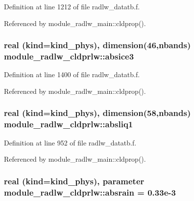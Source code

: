 Definition at line 1212 of file radlw\+\_\+datatb.\+f.



Referenced by module\+\_\+radlw\+\_\+main\+::cldprop().

\subsubsection[{\texorpdfstring{absice3}{absice3}}]{\setlength{\rightskip}{0pt plus 5cm}real (kind=kind\+\_\+phys), dimension(46,nbands) module\+\_\+radlw\+\_\+cldprlw\+::absice3}\hypertarget{namespacemodule__radlw__cldprlw_a3aa04541d0b809367f88ef8aa0eafdbb}{}\label{namespacemodule__radlw__cldprlw_a3aa04541d0b809367f88ef8aa0eafdbb}


Definition at line 1400 of file radlw\+\_\+datatb.\+f.



Referenced by module\+\_\+radlw\+\_\+main\+::cldprop().

\subsubsection[{\texorpdfstring{absliq1}{absliq1}}]{\setlength{\rightskip}{0pt plus 5cm}real (kind=kind\+\_\+phys), dimension(58,nbands) module\+\_\+radlw\+\_\+cldprlw\+::absliq1}\hypertarget{namespacemodule__radlw__cldprlw_a57896538226e9184c3750440d9f62166}{}\label{namespacemodule__radlw__cldprlw_a57896538226e9184c3750440d9f62166}


Definition at line 952 of file radlw\+\_\+datatb.\+f.



Referenced by module\+\_\+radlw\+\_\+main\+::cldprop().

\subsubsection[{\texorpdfstring{absrain}{absrain}}]{\setlength{\rightskip}{0pt plus 5cm}real (kind=kind\+\_\+phys), parameter module\+\_\+radlw\+\_\+cldprlw\+::absrain = 0.\+33e-\/3}\hypertarget{namespacemodule__radlw__cldprlw_a04bff194fec27e0586ab1b4770319882}{}\label{namespacemodule__radlw__cldprlw_a04bff194fec27e0586ab1b4770319882}


